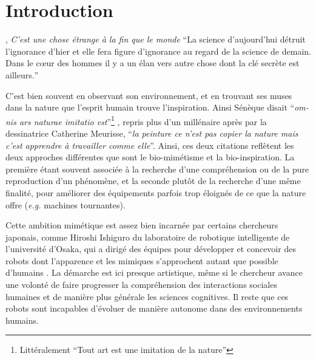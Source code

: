 \chapter*{Introduction}\label{chap0}

\begin{chapquote}{\textcite{ormesson_cest_2010}, \textit{C'est une chose étrange à la fin que le monde}}
	 \foreignquote{french}{La science d'aujourd'hui détruit l'ignorance d'hier et elle fera figure d'ignorance au regard de la science de demain. Dans le cœur des hommes il y a un élan vers autre chose dont la clé secrète est ailleurs.}
\end{chapquote}%

%
C'est bien souvent en observant son environnement, et en trouvant ses muses dans la nature que l'esprit humain trouve l'inspiration. Ainsi Sénèque disait \foreignquote{french}{\textit{omnis ars naturae imitatio est}}\footnote{Littéralement \foreignquote{french}{Tout art est une imitation de la nature}} \parencite[Lettre~LXV]{seneque_le_jeune_lettres_1914}, repris plus d'un millénaire après par %
la dessinatrice Catherine Meurisse, \foreignquote{french}{\textit{la peinture ce n'est pas copier la nature mais c'est apprendre à travailler comme elle}}.
Ainsi, ces deux citations reflètent les deux approches différentes que sont le bio-mimétisme et la bio-inspiration. La première étant souvent associée à la recherche d'une compréhension ou de la pure reproduction d'un phénomène, et la seconde plutôt de la recherche d'une même finalité, pour améliorer des équipements parfois trop éloignés de ce que la nature offre (\textit{e.g.} machines tournantes).

Cette ambition mimétique est assez bien incarnée par certains chercheurs japonais, comme Hiroshi Ishiguro du laboratoire de robotique intelligente de l'université d'Osaka, qui a dirigé des équipes pour développer et concevoir des robots dont l'apparence et les mimiques s'approchent autant que possible d'humains \parencite{hiroshi_how_2020}. La démarche est ici presque artistique, même si le chercheur avance une volonté de faire progresser la compréhension des interactions sociales humaines et de manière plus générale les sciences cognitives. Il reste que ces robots sont incapables d'évoluer de manière autonome dans des environnements humains.

